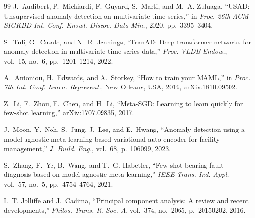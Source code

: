 \documentclass[conference]{IEEEtran}
\begin{document}
\begin{thebibliography}{99}
 J.~Audibert, P.~Michiardi, F.~Guyard, S.~Marti, and
M.~A. Zuluaga, ``USAD: Unsupervised anomaly detection on multivariate time
series,'' in \textit{Proc. 26th ACM SIGKDD Int. Conf. Knowl. Discov. Data
Min.}, 2020, pp.~3395--3404.

 S.~Tuli, G.~Casale, and N.~R. Jennings, ``TranAD: Deep
transformer networks for anomaly detection in multivariate time series
data,'' \textit{Proc. VLDB Endow.}, vol.~15, no.~6, pp.~1201--1214, 2022.

 A.~Antoniou, H.~Edwards, and A.~Storkey, ``How to
train your MAML,'' in \textit{Proc. 7th Int. Conf. Learn. Represent.}, New
Orleans, USA, 2019, arXiv:1810.09502.

 Z.~Li, F.~Zhou, F.~Chen, and H.~Li, ``Meta-SGD: Learning to
learn quickly for few-shot learning,'' arXiv:1707.09835, 2017.

 J.~Moon, Y.~Noh, S.~Jung, J.~Lee, and E.~Hwang, ``Anomaly
detection using a model-agnostic meta-learning-based variational
auto-encoder for facility management,'' \textit{J. Build. Eng.}, vol.~68,
p.~106099, 2023.

 S.~Zhang, F.~Ye, B.~Wang, and T.~G. Habetler, ``Few-shot
bearing fault diagnosis based on model-agnostic meta-learning,''
\textit{IEEE Trans. Ind. Appl.}, vol.~57, no.~5, pp.~4754--4764, 2021.

 I.~T. Jolliffe and J.~Cadima, ``Principal component
analysis: A review and recent developments,'' \textit{Philos. Trans. R. Soc.
A}, vol.~374, no.~2065, p.~20150202, 2016.

\end{thebibliography}
\end{document}
